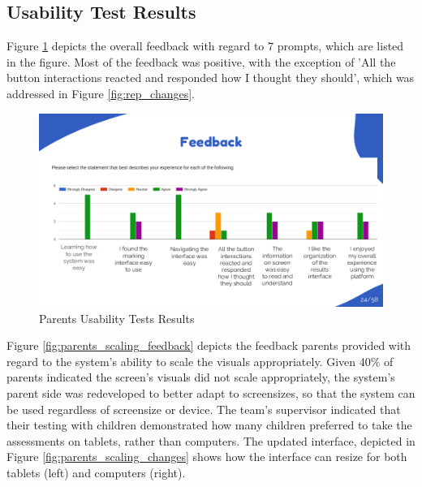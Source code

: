 \documentclass{article}
\begin{document}
\newpage

\subsection{Usability Test Results}

\hspace{2em} Figure \ref{fig:parents_feedback} depicts the overall feedback with regard to 7 prompts, which are listed in the figure.
Most of the feedback was positive, with the exception of 'All the button interactions reacted and responded how I thought they should', which was addressed in Figure \ref{fig:rep_changes}.

\begin{figure}[H]
  \centering
  \includegraphics[width=\textwidth]{images/slide24.png}
  \caption{Parents Usability Tests Results}
  \label{fig:parents_feedback}
\end{figure}

Figure \ref{fig:parents_scaling_feedback} depicts the feedback parents provided with regard to the system's ability to scale the visuals appropriately.
Given 40\% of parents indicated the screen's visuals did not scale appropriately, the system's parent side was redeveloped to better adapt to screensizes, so that the system can be used regardless of screensize or device.
The team's supervisor indicated that their testing with children demonstrated how many children preferred to take the assessments on tablets, rather than computers. The updated interface, depicted in Figure \ref{fig:parents_scaling_changes}
shows how the interface can resize for both tablets (left) and computers (right).
\end{document}
